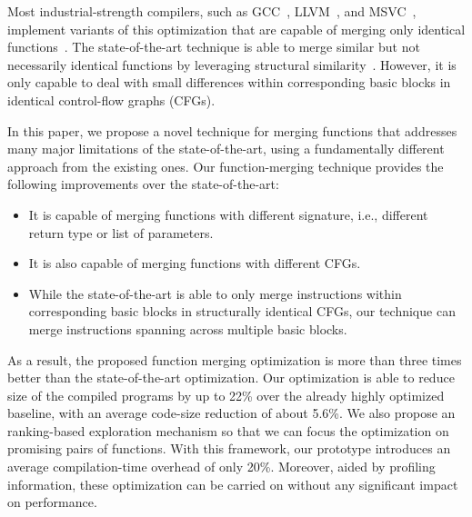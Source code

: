 Most industrial-strength compilers, such as GCC~\cite{gcc}, LLVM~\cite{llvm},
and MSVC~\cite{msvc-icf}, implement variants of this optimization that are
capable of merging only identical functions~\cite{tallam10,kwan12,livska14}.
The state-of-the-art technique is able to merge similar but not necessarily
identical functions by leveraging structural similarity~\cite{edler14}.
However, it is only capable to deal with small differences within
corresponding basic blocks in identical control-flow graphs (CFGs).

In this paper, we propose a novel technique for merging functions
that addresses many major limitations of the state-of-the-art, using a
fundamentally different approach from the existing ones.
Our function-merging technique provides the following improvements over
the state-of-the-art:
\begin{itemize}[noitemsep,topsep=0pt]
  \item It is capable of merging functions with different signature, i.e.,
  different return type or list of parameters.
  \item It is also capable of merging functions with different CFGs.
  \item While the state-of-the-art is able to only merge instructions within
  corresponding basic blocks in structurally identical CFGs,
  our technique can merge instructions spanning across multiple basic blocks.
\end{itemize}
As a result, the proposed function merging optimization is
more than three times better than the state-of-the-art optimization.
Our optimization is able to reduce size of the compiled programs by up to
22\% over the already highly optimized baseline, with an average code-size
reduction of about 5.6\%.
We also propose an ranking-based exploration mechanism so that we can focus
the optimization on promising pairs of functions.
With this framework, our prototype introduces an average compilation-time
overhead of only 20\%.
Moreover, aided by profiling information, these optimization can be carried on
without any significant impact on performance.




